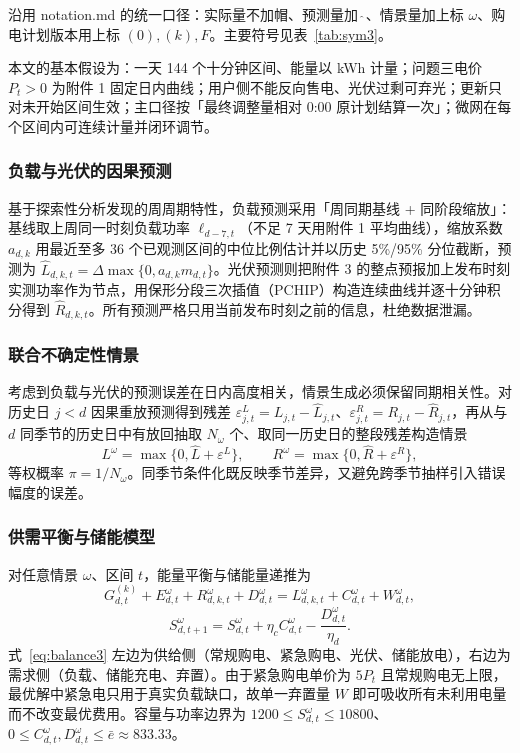 沿用 notation.md 的统一口径：实际量不加帽、预测量加 $\widehat{\ }$、情景量加上标 $\omega$、购电计划版本用上标 $(0),(k),F$。主要符号见表~\ref{tab:sym3}。

本文的基本假设为：一天 144 个十分钟区间、能量以 kWh 计量；问题三电价 $P_t>0$ 为附件 1 固定日内曲线；用户侧不能反向售电、光伏过剩可弃光；更新只对未开始区间生效；主口径按「最终调整量相对 0:00 原计划结算一次」；微网在每个区间内可连续计量并闭环调节。

\subsubsection{负载与光伏的因果预测}

基于探索性分析发现的周周期特性，负载预测采用「周同期基线 + 同阶段缩放」：基线取上周同一时刻负载功率 $\ell_{d-7,t}$（不足 7 天用附件 1 平均曲线），缩放系数 $a_{d,k}$ 用最近至多 36 个已观测区间的中位比例估计并以历史 5\%/95\% 分位截断，预测为 $\widehat L_{d,k,t}=\Delta\max\{0,a_{d,k}m_{d,t}\}$。光伏预测则把附件 3 的整点预报加上发布时刻实测功率作为节点，用保形分段三次插值（PCHIP）构造连续曲线并逐十分钟积分得到 $\widehat R_{d,k,t}$。所有预测严格只用当前发布时刻之前的信息，杜绝数据泄漏。

\subsubsection{联合不确定性情景}

考虑到负载与光伏的预测误差在日内高度相关，情景生成必须保留同期相关性。对历史日 $j<d$ 因果重放预测得到残差 $\varepsilon^L_{j,t}=L_{j,t}-\widehat L_{j,t}$、$\varepsilon^R_{j,t}=R_{j,t}-\widehat R_{j,t}$，再从与 $d$ 同季节的历史日中有放回抽取 $N_\omega$ 个、取同一历史日的整段残差构造情景
\begin{equation}
L^\omega=\max\{0,\widehat L+\varepsilon^L\},\qquad R^\omega=\max\{0,\widehat R+\varepsilon^R\},\label{eq:scenario3}
\end{equation}
等权概率 $\pi=1/N_\omega$。同季节条件化既反映季节差异，又避免跨季节抽样引入错误幅度的误差。

\subsubsection{供需平衡与储能模型}

对任意情景 $\omega$、区间 $t$，能量平衡与储能量递推为
\begin{equation}
G^{(k)}_{d,t}+E^\omega_{d,t}+R^\omega_{d,k,t}+D^\omega_{d,t}=L^\omega_{d,k,t}+C^\omega_{d,t}+W^\omega_{d,t},\label{eq:balance3}
\end{equation}
\begin{equation}
S^\omega_{d,t+1}=S^\omega_{d,t}+\eta_c C^\omega_{d,t}-\frac{D^\omega_{d,t}}{\eta_d}.\label{eq:soc3}
\end{equation}
式~\eqref{eq:balance3} 左边为供给侧（常规购电、紧急购电、光伏、储能放电），右边为需求侧（负载、储能充电、弃置）。由于紧急购电单价为 $5P_t$ 且常规购电无上限，最优解中紧急电只用于真实负载缺口，故单一弃置量 $W$ 即可吸收所有未利用电量而不改变最优费用。容量与功率边界为 $1200\le S^\omega_{d,t}\le10800$、$0\le C^\omega_{d,t},D^\omega_{d,t}\le\bar e\approx833.33$。

